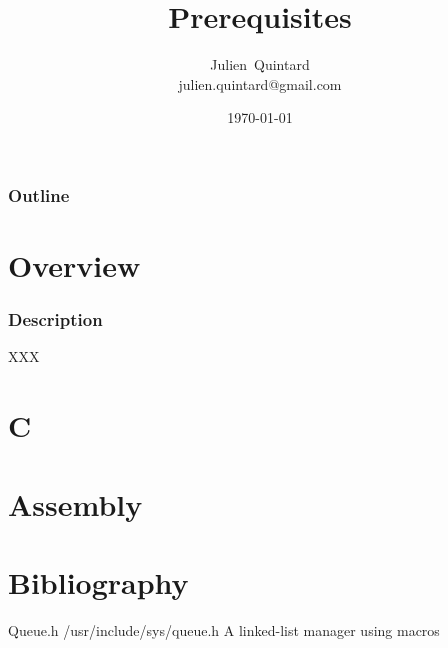 \documentclass[8pt]{beamer}
\title{Prerequisites}
\author
{
  Julien~Quintard\inst{1} \\
  {\tiny julien.quintard@gmail.com}
}
\institute
{
  \inst{1} kaneton distributed operating system project
}
\date{\today}
\begin{document}
%
%

\begin{frame}
  \titlepage

  \begin{center}
     \hspace{0.1cm}  \hspace{0.1cm}
     \hspace{0.1cm}
  \end{center}
\end{frame}

%
%

\begin{frame}
  \frametitle{Outline}
  \tableofcontents
\end{frame}

%
%

\section{Overview}


\begin{frame}
  \frametitle{Description}

  XXX
\end{frame}

%
%

\section{C}


%
%

\section{Assembly}


%
%

\section{Bibliography}

\begin{thebibliography}{3}


    Queue.h
    \newblock /usr/include/sys/queue.h
    \newblock A linked-list manager using macros
\end{thebibliography}
\end{document}
